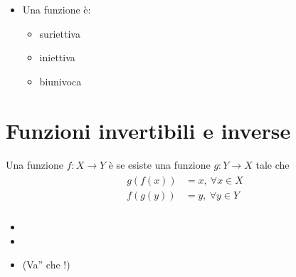 \documentclass[letterpaper,10pt,italian]{jupyterBook}
\begin{document}
\begin{itemize}
\item {} 
\sphinxAtStartPar
{} Una funzione è:
\begin{itemize}
\item {} 
\sphinxAtStartPar
suriettiva 

\item {} 
\sphinxAtStartPar
iniettiva 

\item {} 
\sphinxAtStartPar
biunivoca 

\end{itemize}

\end{itemize}


\section{Funzioni invertibili e inverse}
\label{\detokenize{ch/precalculus/real-functions:funzioni-invertibili-e-inverse}}\label{\detokenize{ch/precalculus/real-functions:math-hs-precalculus-real-functions-inverse}}
\sphinxAtStartPar
Una funzione \(f: X \rightarrow Y\) è  se esiste una funzione \(g: Y \rightarrow X\) tale che
\begin{equation*}
\begin{split}\begin{aligned}
  g\left( f(x) \right) & = x , \ \forall x \in X \\
  f\left( g(y) \right) & = y , \ \forall y \in Y \\
\end{aligned}\end{split}
\end{equation*}\begin{itemize}
\item {} 
\sphinxAtStartPar
{}

\item {} 
\sphinxAtStartPar
{}

\item {} 
\sphinxAtStartPar
{} (Va” che {\hyperref[\detokenize{ch/logics:logics-syllogism}]{}}!)

\end{itemize}
\end{document}
